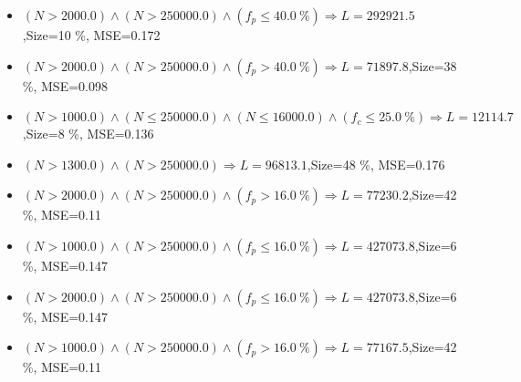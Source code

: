 \documentclass[numbered]{CSL}
\begin{document}
\begin{itemize}
\item $(N > 2000.0) \land (N > 250000.0) \land (f_p \leq 40.0~\%) \Rightarrow L = 292921.5$,\hfill Size=10 \%, MSE=0.172
\item $(N > 2000.0) \land (N > 250000.0) \land (f_p > 40.0~\%) \Rightarrow L = 71897.8$,\hfill Size=38 \%, MSE=0.098
\item $(N > 1000.0) \land (N \leq 250000.0) \land (N \leq 16000.0) \land (f_c \leq 25.0~\%) \Rightarrow L = 12114.7$,\hfill Size=8 \%, MSE=0.136
\item $(N > 1300.0) \land (N > 250000.0) \Rightarrow L = 96813.1$,\hfill Size=48 \%, MSE=0.176
\item $(N > 2000.0) \land (N > 250000.0) \land (f_p > 16.0~\%) \Rightarrow L = 77230.2$,\hfill Size=42 \%, MSE=0.11
\item $(N > 1000.0) \land (N > 250000.0) \land (f_p \leq 16.0~\%) \Rightarrow L = 427073.8$,\hfill Size=6 \%, MSE=0.147
\item $(N > 2000.0) \land (N > 250000.0) \land (f_p \leq 16.0~\%) \Rightarrow L = 427073.8$,\hfill Size=6 \%, MSE=0.147
\item $(N > 1000.0) \land (N > 250000.0) \land (f_p > 16.0~\%) \Rightarrow L = 77167.5$,\hfill Size=42 \%, MSE=0.11
\end{itemize}
\end{document}
